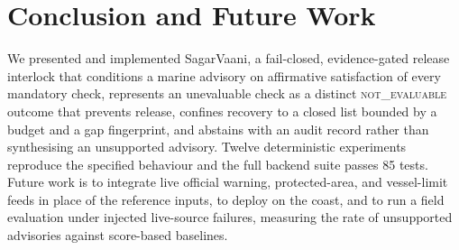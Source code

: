\documentclass[conference]{IEEEtran}
\newcommand{\NE}{\textsc{not\_evaluable}}
\begin{document}
\section{Conclusion and Future Work}
We presented and implemented SagarVaani, a fail-closed, evidence-gated release interlock that conditions a marine advisory on affirmative satisfaction of every mandatory check, represents an unevaluable check as a distinct \NE{} outcome that prevents release, confines recovery to a closed list bounded by a budget and a gap fingerprint, and abstains with an audit record rather than synthesising an unsupported advisory. Twelve deterministic experiments reproduce the specified behaviour and the full backend suite passes 85 tests. Future work is to integrate live official warning, protected-area, and vessel-limit feeds in place of the reference inputs, to deploy on the coast, and to run a field evaluation under injected live-source failures, measuring the rate of unsupported advisories against score-based baselines.



\end{document}
